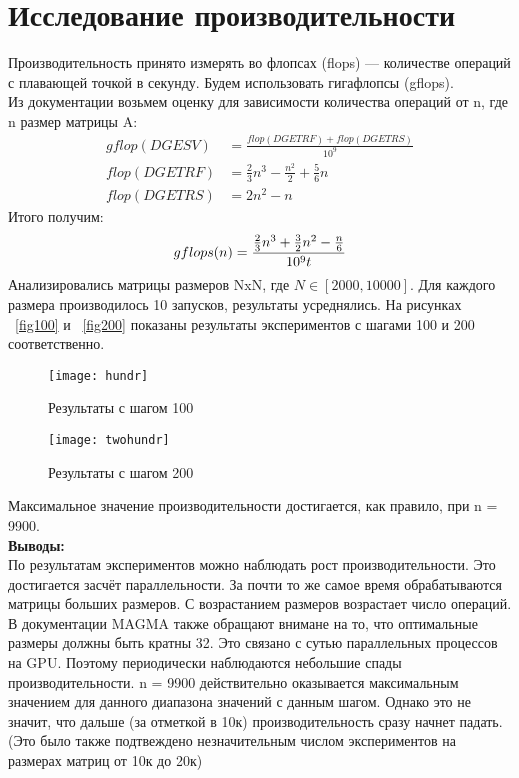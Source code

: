 \documentclass[12pt]{article}
\begin{document}
	\section{Исследование производительности}
	
	Производительность принято измерять во флопсах (flops) --- количестве операций с плавающей точкой в секунду. Будем использовать гигафлопсы (gflops). \\
	Из документации возьмем оценку для зависимости количества операций от n, где n размер матрицы A: \\ 
	\begin{align*}
	gflop(DGESV) &= \frac{flop(DGETRF) + flop(DGETRS)}{10^{9}} \\
	flop(DGETRF) &= \frac{2}{3}n^{3} - \frac{n^{2}}{2} + \frac{5}{6}n \\
	flop(DGETRS) &= 2n^{2} - n
	\end{align*}
	Итого получим:\\
	\begin{equation*}
	gflops(n) = \frac{\frac{2}{3}n^{3} + \frac{3}{2}n^{2} - \frac{n}{6}}{10^{9}t} \\
	\end{equation*}
	Анализировались матрицы размеров NxN, где $N \in [2000, 10000]$. Для каждого размера производилось 10 запусков, результаты усреднялись. На рисунках ~\eqref{fig100} и ~\eqref{fig200} показаны результаты экспериментов с шагами 100 и 200 соответственно. \\
	
	\begin{figure}[ht]
		\centering
		\texttt{[image: hundr]}
		\caption{Результаты с шагом 100}
		\label{fig100}
	\end{figure}

	\begin{figure}[ht]
		\centering
		\texttt{[image: twohundr]}
		\caption{Результаты с шагом 200}
		\label{fig200}
	\end{figure}


	\noindent
	Максимальное значение производительности достигается, как правило, при n = 9900. \\
	
	\noindent
	\large{\textbf{Выводы:}} \\
	По результатам экспериментов можно наблюдать рост производительности. Это достигается засчёт параллельности. За почти то же самое время обрабатываются матрицы больших размеров. С возрастанием размеров возрастает число операций. В документации MAGMA также обращают внимане на то, что оптимальные размеры должны быть кратны 32. Это связано с сутью параллельных процессов на GPU. Поэтому периодически наблюдаются небольшие спады производительности. n = 9900 действительно оказывается максимальным значением для данного диапазона значений с данным шагом. Однако это не значит, что дальше (за отметкой в 10к) производительность сразу начнет падать. (Это было также подтвеждено незначительным числом экспериментов на размерах матриц от 10к до 20к) 
	
\end{document}
